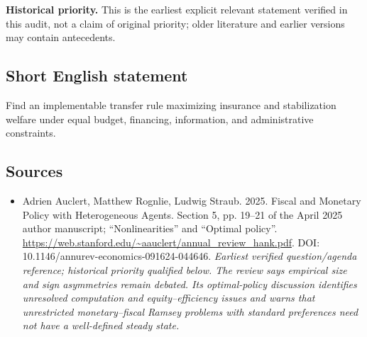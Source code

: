 \documentclass[11pt]{article}
\begin{document}
\par\textbf{Historical priority.} This is the earliest explicit relevant statement verified in this audit, not a claim of original priority; older literature and earlier versions may contain antecedents.

\subsection{Short English statement}
Find an implementable transfer rule maximizing insurance and stabilization welfare under equal budget, financing, information, and administrative constraints.

\subsection{Sources}
\begin{itemize}\raggedright
\item[\textnormal{[S1]}]\hypertarget{source:30007534:1}{} Adrien Auclert, Matthew Rognlie, Ludwig Straub. 2025. Fiscal and Monetary Policy with Heterogeneous Agents. Section 5, pp. 19–21 of the April 2025 author manuscript; “Nonlinearities” and “Optimal policy”.
\url{https://web.stanford.edu/~aauclert/annual_review_hank.pdf}.
DOI: 10.1146/annurev-economics-091624-044646.
{\small\textit{Earliest verified question/agenda reference; historical priority qualified below. The review says empirical size and sign asymmetries remain debated. Its optimal-policy discussion identifies unresolved computation and equity–efficiency issues and warns that unrestricted monetary–fiscal Ramsey problems with standard preferences need not have a well-defined steady state.}}
\end{itemize}
\end{document}
